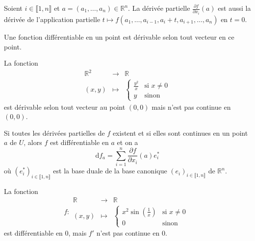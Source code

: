   \begin{remark}
    Soient $i \in \llbracket 1, n \rrbracket$ et $a = (a_1, \dots, a_n) \in \mathbb{R}^n$. La dérivée partielle $\frac{\partial f}{\partial x_i}(a)$ est aussi la dérivée de l'application partielle $t \mapsto f(a_1, \dots, a_{i-1}, a_i + t, a_{i+1}, \dots, a_n)$ en $t = 0$.
  \end{remark}

  \begin{proposition}
    Une fonction différentiable en un point est dérivable selon tout vecteur en ce point.
  \end{proposition}


  \begin{cexample}
    La fonction
    \[
    \begin{array}{ccc}
      \mathbb{R}^2 &\rightarrow& \mathbb{R} \\
      (x,y) &\mapsto& \begin{cases}
        \frac{y^2}{x} &\text{si } x \neq 0 \\
        y &\text{sinon}
      \end{cases}
    \end{array}
    \]
    est dérivable selon tout vecteur au point $(0,0)$ mais n'est pas continue en $(0,0)$.
  \end{cexample}


  \begin{theorem}
    Si toutes les dérivées partielles de $f$ existent et si elles sont continues en un point $a$ de $U$, alors $f$ est différentiable en $a$ et on a
    \[ \mathrm{d}f_a = \sum_{i=1}^n \frac{\partial f}{\partial x_i}(a) e_i^* \]
    où $(e_i^*)_{i \in \llbracket 1, n \rrbracket}$ est la base duale de la base canonique $(e_i)_{i \in \llbracket 1, n \rrbracket}$ de $\mathbb{R}^n$.
  \end{theorem}

  \begin{cexample}
    La fonction
    \[
    f :
    \begin{array}{ccc}
      \mathbb{R} &\rightarrow& \mathbb{R} \\
      (x,y) &\mapsto& \begin{cases}
        x^2 \sin \left( \frac{1}{x} \right) &\text{si } x \neq 0 \\
        0 &\text{sinon}
      \end{cases}
    \end{array}
    \]
    est différentiable en $0$, mais $f'$ n'est pas continue en $0$.
  \end{cexample}

